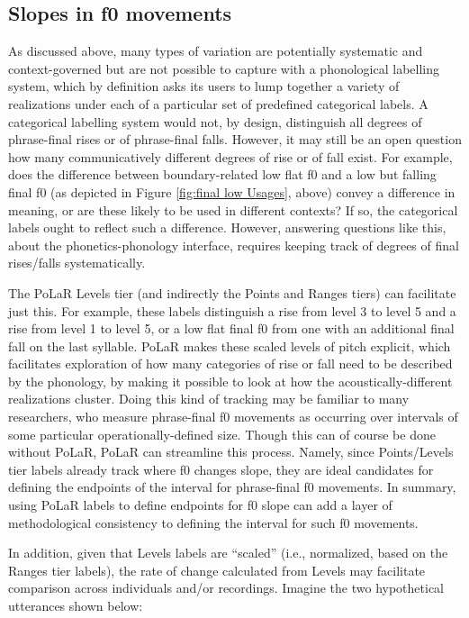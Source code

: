 \documentclass[11pt, twoside]{memoir}
\begin{document}
\subsection{Slopes in f0 movements}\label{sec:pitch-slopes}
As discussed above, many types of variation are potentially systematic and context-governed but are not possible to capture with a phonological labelling system, which by definition asks its users to lump together a variety of realizations under each of a particular set of predefined categorical labels. A categorical labelling system would not, by design, distinguish all degrees of phrase-final rises or of phrase-final falls. However, it may still be an open question how many communicatively different degrees of rise or of fall exist. For example, does the difference between boundary-related low flat f0 and a low but falling final f0 (as depicted in Figure \ref{fig:final low Usages}, above) convey a difference in meaning, or are these likely to be used in different contexts? If so, the categorical labels ought to reflect such a difference. However, answering questions like this, about the phonetics-phonology interface, requires keeping track of degrees of final rises\slash falls systematically.

The PoLaR Levels tier (and indirectly the Points and Ranges tiers) can facilitate just this. For example, these labels distinguish a rise from level 3 to level 5 and a rise from level 1 to level 5, or a low flat final f0 from one with an additional final fall on the last syllable. PoLaR makes these scaled levels of pitch explicit, which facilitates exploration of how many categories of rise or fall need to be described by the phonology, by making it possible to look at how the acoustically-different realizations cluster. Doing this kind of tracking may be familiar to many researchers, who measure phrase-final f0 movements as occurring over intervals of some particular operationally-defined size. Though this can of course be done without PoLaR, PoLaR can streamline this process. Namely, since Points\slash Levels tier labels already track where f0 changes slope, they are ideal candidates for defining the endpoints of the interval for phrase-final f0 movements. In summary, using PoLaR labels to define endpoints for f0 slope can add a layer of methodological consistency to defining the interval for such f0 movements.

In addition, given that Levels labels are “scaled” (i.e., normalized, based on the Ranges tier labels), the rate of change calculated from Levels may facilitate comparison across individuals and/or recordings. Imagine the two hypothetical utterances shown below:
\end{document}
